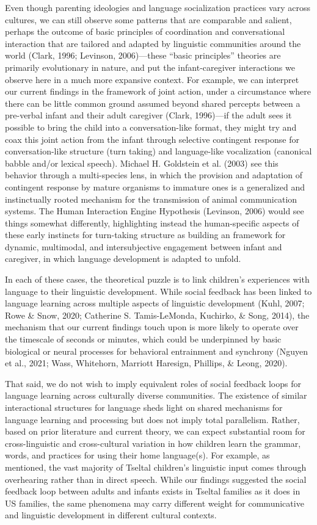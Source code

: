 \documentclass[
  man]{apa6}
\begin{document}
Even though parenting ideologies and language socialization practices vary across cultures, we can still observe some patterns that are comparable and salient, perhaps the outcome of basic principles of coordination and conversational interaction that are tailored and adapted by linguistic communities around the world (Clark, 1996; Levinson, 2006)---these ``basic principles'' theories are primarily evolutionary in nature, and put the infant-caregiver interactions we observe here in a much more expansive context. For example, we can interpret our current findings in the framework of joint action, under a circumstance where there can be little common ground assumed beyond shared percepts between a pre-verbal infant and their adult caregiver (Clark, 1996)---if the adult sees it possible to bring the child into a conversation-like format, they might try and coax this joint action from the infant through selective contingent response for conversation-like structure (turn taking) and language-like vocalization (canonical babble and/or lexical speech). Michael H. Goldstein et al. (2003) see this behavior through a multi-species lens, in which the provision and adaptation of contingent response by mature organisms to immature ones is a generalized and instinctually rooted mechanism for the transmission of animal communication systems. The Human Interaction Engine Hypothesis (Levinson, 2006) would see things somewhat differently, highlighting instead the human-specific aspects of these early instincts for turn-taking structure as building an framework for dynamic, multimodal, and intersubjective engagement between infant and caregiver, in which language development is adapted to unfold.

In each of these cases, the theoretical puzzle is to link children's experiences with language to their linguistic development. While social feedback has been linked to language learning across multiple aspects of linguistic development (Kuhl, 2007; Rowe \& Snow, 2020; Catherine S. Tamis-LeMonda, Kuchirko, \& Song, 2014), the mechanism that our current findings touch upon is more likely to operate over the timescale of seconds or minutes, which could be underpinned by basic biological or neural processes for behavioral entrainment and synchrony (Nguyen et al., 2021; Wass, Whitehorn, Marriott Haresign, Phillips, \& Leong, 2020).

That said, we do not wish to imply equivalent roles of social feedback loops for language learning across culturally diverse communities. The existence of similar interactional structures for language sheds light on shared mechanisms for language learning and processing but does not imply total parallelism. Rather, based on prior literature and current theory, we can expect substantial room for cross-linguistic and cross-cultural variation in how children learn the grammar, words, and practices for using their home language(s). For example, as mentioned, the vast majority of Tseltal children's linguistic input comes through overhearing rather than in direct speech. While our findings suggested the social feedback loop between adults and infants exists in Tseltal families as it does in US families, the same phenomena may carry different weight for communicative and linguistic development in different cultural contexts.
\end{document}
